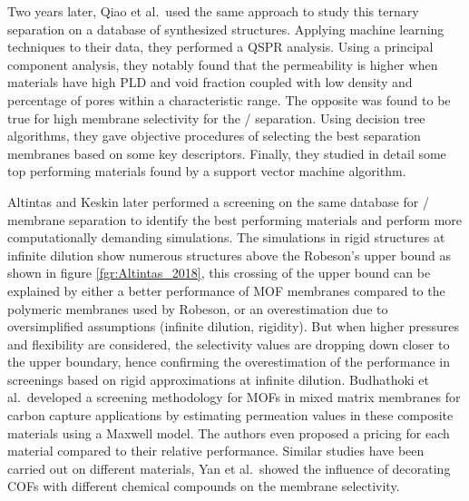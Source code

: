 \documentclass[main.tex]{subfiles}
\begin{document}
Two years later, Qiao et al.\ used the same approach to study this ternary separation on a database of synthesized structures.\cite{Qiao_2018} Applying machine learning techniques to their data, they performed a QSPR analysis. Using a principal component analysis, they notably found that the permeability is higher when materials have high PLD and void fraction coupled with low density and percentage of pores within a characteristic range. The opposite was found to be true for high membrane selectivity for the / separation. Using decision tree algorithms, they gave objective procedures of selecting the best separation membranes based on some key descriptors. Finally, they studied in detail some top performing materials found by a support vector machine algorithm.

Altintas and Keskin later performed a screening on the same database for / membrane separation to identify the best performing materials and perform more computationally demanding simulations.\cite{Altintas_2018} {The simulations in rigid structures at infinite dilution show numerous structures above the Robeson's upper bound as shown in figure \ref{fgr:Altintas_2018}, this crossing of the upper bound can be explained by either a better performance of MOF membranes compared to the polymeric membranes used by Robeson, or an overestimation due to oversimplified assumptions (infinite dilution, rigidity). But when higher pressures and flexibility are considered, the selectivity values are dropping down closer to the upper boundary}, hence confirming the overestimation of the performance in screenings {based on rigid approximations at infinite dilution}.  Budhathoki et al.\ developed a screening methodology for MOFs in mixed matrix membranes for carbon capture applications by estimating permeation values in these composite materials using a Maxwell model.\cite{Budhathoki_2019} The authors even proposed a pricing for each material compared to their relative performance. Similar studies have been carried out on different materials, Yan et al.\ showed the influence of decorating COFs with different chemical compounds on the membrane selectivity.\cite{Yan_2018}
\end{document}
